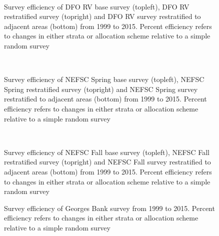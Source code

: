 \documentclass[11pt]{article}
\newcommand{\e}{/backup/bio_data/bio.lobster/figures/} %
\begin{document}


\begin{figure}
\centering
{}
\\
\caption{Survey efficiency of DFO RV base survey (topleft), DFO RV restratified survey (topright) and DFO RV survey restratified to adjacent areas (bottom) from 1999 to 2015. Percent efficiency refers to changes in either strata or allocation scheme relative to a simple random survey }
\end{figure}
\clearpage



\begin{figure}
\centering
{}
\\
\caption{Survey efficiency of NEFSC Spring base survey (topleft), NEFSC Spring restratified survey (topright) and NEFSC Spring survey restratified to adjacent areas (bottom) from 1999 to 2015. Percent efficiency refers to changes in either strata or allocation scheme relative to a simple random survey }
\end{figure}
\clearpage


\begin{figure}
\centering
{}
\\
\caption{Survey efficiency of NEFSC Fall base survey (topleft), NEFSC Fall restratified survey (topright) and NEFSC Fall survey restratified to adjacent areas (bottom) from 1999 to 2015. Percent efficiency refers to changes in either strata or allocation scheme relative to a simple random survey }
\end{figure}
\clearpage



\begin{figure}
\centering
{}
\caption{Survey efficiency of Georges Bank survey from 1999 to 2015. Percent efficiency refers to changes in either strata or allocation scheme relative to a simple random survey }
\end{figure}
\clearpage
\end{document}
